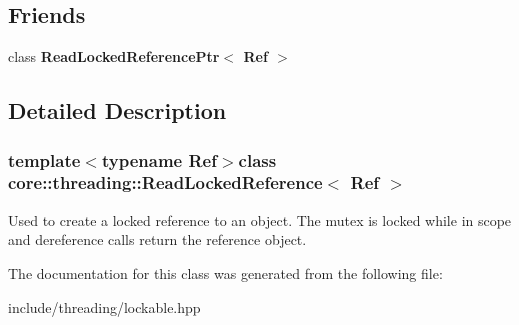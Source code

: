 \subsection*{Friends}
\begin{DoxyCompactItemize}
\item 
\hypertarget{classcore_1_1threading_1_1_read_locked_reference_a4582260a7ef2d7149cc16f025cab27d7}{class {\bfseries Read\-Locked\-Reference\-Ptr$<$ Ref $>$}}\label{classcore_1_1threading_1_1_read_locked_reference_a4582260a7ef2d7149cc16f025cab27d7}

\end{DoxyCompactItemize}


\subsection{Detailed Description}
\subsubsection*{template$<$typename Ref$>$class core\-::threading\-::\-Read\-Locked\-Reference$<$ Ref $>$}

Used to create a locked reference to an object. The mutex is locked while in scope and dereference calls return the reference object. 

The documentation for this class was generated from the following file\-:\begin{DoxyCompactItemize}
\item 
include/threading/lockable.\-hpp\end{DoxyCompactItemize}
